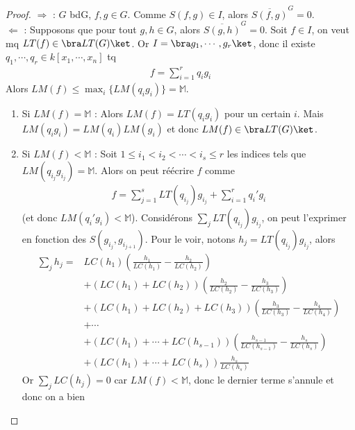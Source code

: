         \begin{proof}
            $\Rightarrow$ : $G$ bdG, $f,g \in G$. Comme $S(f,g) \in I$, alors $\overline{S(f,g)}^G = 0$. \\
            $\Leftarrow$ : Supposons que pour tout $g,h \in G$, alors $\overline{S(g,h)}^G = 0$. Soit $f \in I$, on veut mq $LT(f) \in \bra LT(G) \ket$. Or $I = \bra g_1, \cdots, g_r \ket$, donc il existe $q_1, \cdots, q_r \in k[x_1, \cdots, x_n]$ tq 
            \begin{align*}
                f = \sum_{i = 1}^r q_ig_i
            \end{align*}
            Alors $LM(f) \leq \max_i \{LM(q_ig_i)\} = \mathbb{M}$.
            \begin{enumerate}
                \item Si $LM(f) = \mathbb{M}$ : Alors $LM(f) = LT(q_ig_i)$ pour un certain $i$. Mais $LM(q_ig_i) = LM(q_i)LM(g_i)$ et donc $LM(f) \in \bra LT(G) \ket$.
                \item Si $LM(f) < \mathbb{M}$ : Soit $1 \leq i_1 < i_2 < \cdots < i_s \leq r$ les indices tels que $LM(q_{i_j}g_{i_j}) = \mathbb{M}$. Alors on peut réécrire $f$ comme
                \begin{align*}
                    f = \sum_{j = 1}^s LT(q_{i_j})g_{i_j} + \sum_{i = 1}^r q_i'g_i
                \end{align*}
                (et donc $LM(q_i'g_i) < \mathbb{M}$). Considérons $\sum_j LT(q_{i_j})g_{i_j}$, on peut l'exprimer en fonction des $S(g_{i_j}, g_{i_{j+1}})$. Pour le voir, notons $h_j = LT(q_{i_j})g_{i_j}$, alors
                \begin{align*}
                    \sum_j h_j = &LC(h_1)\left( \frac{h_1}{LC(h_1)} - \frac{h_2}{LC(h_2)} \right) \\
                    &+ (LC(h_1) + LC(h_2))\left( \frac{h_2}{LC(h_2)} - \frac{h_3}{LC(h_3)} \right) \\
                    &+ (LC(h_1) + LC(h_2) + LC(h_3))\left( \frac{h_3}{LC(h_3)} - \frac{h_4}{LC(h_4)} \right) \\
                    & + \cdots \\
                    &+(LC(h_1) + \cdots + LC(h_{s-1}))\left( \frac{h_{s-1}}{LC(h_{s-1})} - \frac{h_s}{LC(h_s)} \right) \\
                    &+ (LC(h_1) + \cdots + LC(h_s))\frac{h_s}{LC(h_s)}
                \end{align*}
                Or $\sum_j LC(h_j) = 0$ car $LM(f) < \mathbb{M}$, donc le dernier terme s'annule et donc on a bien

\end{enumerate}
\end{proof}
